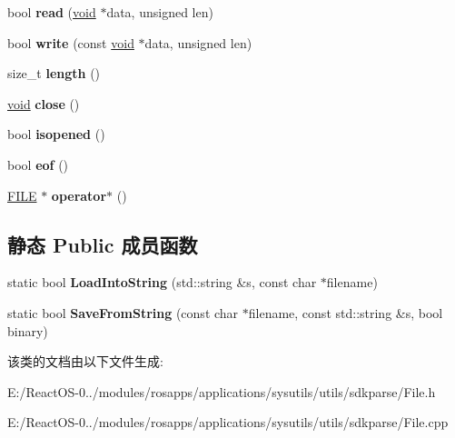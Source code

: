 \begin{DoxyCompactItemize}
bool {\bfseries read} (\hyperlink{interfacevoid}{void} $\ast$data, unsigned len)
\item 
\mbox{\label{class_file_a19da8736a34d975847d4cda2dcdd0d44}} 
bool {\bfseries write} (const \hyperlink{interfacevoid}{void} $\ast$data, unsigned len)
\item 
\mbox{\label{class_file_a7b6d7975f01bbb50b7d247541a90398e}} 
size\+\_\+t {\bfseries length} ()
\item 
\mbox{\label{class_file_a83cbce54d6c3b8c2f417b51f6b3f488c}} 
\hyperlink{interfacevoid}{void} {\bfseries close} ()
\item 
\mbox{\label{class_file_ada85e83c41cc0e75e61aced720580a12}} 
bool {\bfseries isopened} ()
\item 
\mbox{\label{class_file_a7ad839a71e58eadc67ea20fa7595aa76}} 
bool {\bfseries eof} ()
\item 
\mbox{\label{class_file_a82bce9d7eeb9b7ca34b8c5174f6e735d}} 
\hyperlink{struct__iobuf}{F\+I\+LE} $\ast$ {\bfseries operator$\ast$} ()
\end{DoxyCompactItemize}
\subsection*{静态 Public 成员函数}
\begin{DoxyCompactItemize}
\item 
\mbox{\label{class_file_a0e70899577b4e105a2a9fd7ae0219c21}} 
static bool {\bfseries Load\+Into\+String} (std\+::string \&s, const char $\ast$filename)
\item 
\mbox{\label{class_file_a0e1ea11072f97abe5c4c021c2bdd3ef1}} 
static bool {\bfseries Save\+From\+String} (const char $\ast$filename, const std\+::string \&s, bool binary)
\end{DoxyCompactItemize}


该类的文档由以下文件生成\+:\begin{DoxyCompactItemize}
\item 
E\+:/\+React\+O\+S-\/0../modules/rosapps/applications/sysutils/utils/sdkparse/File.\+h\item 
E\+:/\+React\+O\+S-\/0../modules/rosapps/applications/sysutils/utils/sdkparse/File.\+cpp\end{DoxyCompactItemize}
